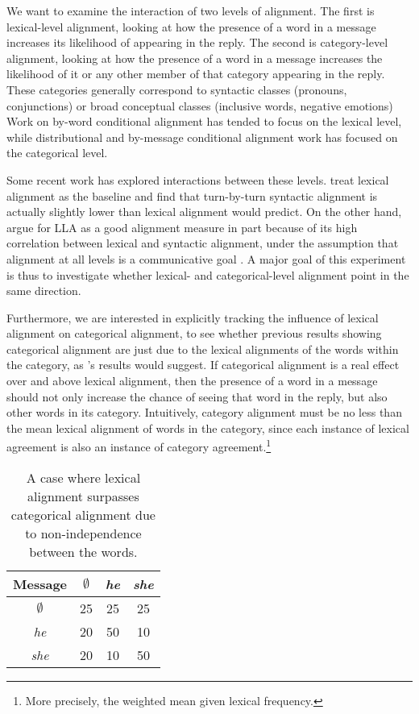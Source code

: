 \documentclass[11pt]{article}
\begin{document}
We want to examine the interaction of two levels of alignment. The first is lexical-level alignment, looking at how the presence of a word in a message increases its likelihood of appearing in the reply.  The second is category-level alignment, looking at how the presence of a word in a message increases the likelihood of it or any other member of that category appearing in the reply.  These categories generally correspond to syntactic classes (pronouns, conjunctions) or broad conceptual classes (inclusive words, negative emotions)   Work on by-word conditional alignment has tended to focus on the lexical level, while distributional and by-message conditional alignment work has focused on the categorical level.

Some recent work has explored interactions between these levels.  treat lexical alignment as the baseline and find that turn-by-turn syntactic alignment is actually slightly lower than lexical alignment would predict. On the other hand,  argue for LLA as a good alignment measure in part because of its high correlation between lexical and syntactic alignment, under the assumption that alignment at all levels is a communicative goal \cite{PickeringGarrod2004}. A major goal of this experiment is thus to investigate whether lexical- and categorical-level alignment point in the same direction.

Furthermore, we are interested in explicitly tracking the influence of lexical alignment on categorical alignment, to see whether previous results showing categorical alignment are just due to the lexical alignments of the words within the category, as 's results would suggest.  If categorical alignment is a real effect over and above lexical alignment, then the presence of a word in a message should not only increase the chance of seeing that word in the reply, but also other words in its category. Intuitively, category alignment must be no less than the mean lexical alignment of words in the category, since each instance of lexical agreement is also an instance of category agreement.\footnote{More precisely, the weighted mean given lexical frequency.} 

\begin{table}[h]
\begin{center}
\begin{tabular}{|c||c|c|c|}
\hline 
\bf Message & $\emptyset$ & \textit{he} & \textit{she} \\ \hline
$\emptyset$ & 25 & 25 & 25\\
\textit{he} & 20 & 50 & 10 \\
\textit{she} & 20 & 10 & 50 \\
\hline
\end{tabular}
\end{center}
\caption{\label{table:cnw-example1} A case where lexical alignment surpasses categorical alignment due to non-independence between the words.}
\end{table}
\end{document}
